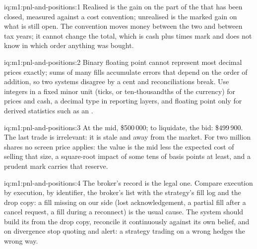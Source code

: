 \begin{solution}{iq:m1:pnl-and-positions:1}
Realised is the gain on the part of the  that has been closed,
measured against a cost convention; unrealised is the marked gain on what is
still open. The convention moves money between the two and between tax
years; it cannot change the total, which is cash plus  times mark
and does not know in which order anything was bought.
\end{solution}

\begin{solution}{iq:m1:pnl-and-positions:2}
Binary floating point cannot represent most decimal prices exactly; sums of
many fills accumulate errors that depend on the order of addition, so two
systems disagree by a cent and reconciliations break. Use integers in a
fixed minor unit (ticks, or ten-thousandths of the currency) for prices and
cash, a decimal type in reporting layers, and floating point only for derived
statistics such as an .
\end{solution}

\begin{solution}{iq:m1:pnl-and-positions:3}
At the mid, \$500\,000; to liquidate, the bid: \$499\,900. The last trade is
irrelevant: it is stale and away from the market. For two million shares no
screen price applies: the value is the mid less the expected cost of selling
that size, a square-root impact of some tens of basis points at least, and a
prudent mark carries that reserve.
\end{solution}

\begin{solution}{iq:m1:pnl-and-positions:4}
The broker's record is the legal one. Compare execution by execution, by
identifier, the broker's list with the strategy's fill log and the drop
copy: a fill missing on our side (lost acknowledgement, a partial fill after
a cancel request, a fill during a reconnect) is the usual cause. The system
should build its  from the drop copy, reconcile it continuously
against its own belief, and on divergence stop quoting and alert: a strategy
trading on a wrong  hedges the wrong way.
\end{solution}

